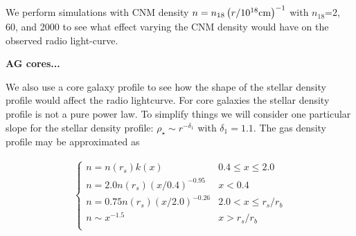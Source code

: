\documentclass[usenatbib,fleqn]{mn2e}
\begin{document}
We perform simulations with CNM density $n=n_{18} \left(r/10^{18} {\rm
  cm}\right)^{-1}$ with $n_{18}$=2, 60, and 2000 to see what effect
varying the CNM density would have on the observed radio light-curve.






{\bf AG cores...}

We also use a core galaxy profile to see how the shape of the stellar
density profile would affect the radio lightcurve. For core galaxies
the stellar density profile is not a pure power law. To simplify
things we will consider one particular slope for the stellar density
profile: $\rho_\star\sim r^{-\delta_1}$ with $\delta_1=1.1$. The gas
density profile may be approximated as

\begin{align}
\begin{cases}
n=n(r_s) k(x) & 0.4 \leq x\leq 2.0\\
n = 2.0 n(r_s) (x/0.4)^{-0.95} & x < 0.4\\
n = 0.75 n(r_s) (x/2.0)^{-0.26} & 2.0< x \leq r_s/r_b\\
n \sim x^{-1.5} & x>r_s/r_b\\
\end{cases}
\label{eq:cores}
\end{align}
\end{document}
